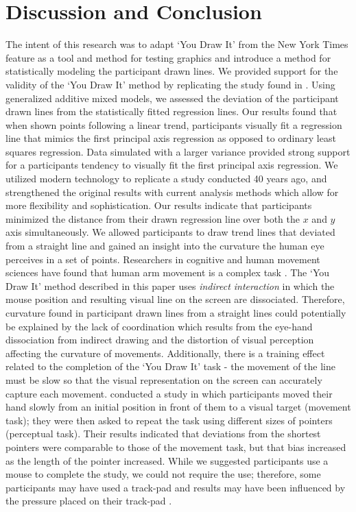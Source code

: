 \documentclass[12pt]{article}
\begin{document}
\hypertarget{conclusion-discussion}{%
\section{Discussion and Conclusion}\label{conclusion-discussion}}

The intent of this research was to adapt `You Draw It' from the New York
Times feature as a tool and method for testing graphics and introduce a
method for statistically modeling the participant drawn lines. We
provided support for the validity of the `You Draw It' method by
replicating the study found in \citet{mosteller1981eye}. Using
generalized additive mixed models, we assessed the deviation of the
participant drawn lines from the statistically fitted regression lines.
Our results found that when shown points following a linear trend,
participants visually fit a regression line that mimics the first
principal axis regression as opposed to ordinary least squares
regression. Data simulated with a larger variance provided strong
support for a participants tendency to visually fit the first principal
axis regression. We utilized modern technology to replicate a study
conducted 40 years ago, and strengthened the original results with
current analysis methods which allow for more flexibility and
sophistication. Our results indicate that participants minimized the
distance from their drawn regression line over both the \(x\) and \(y\)
axis simultaneously. We allowed participants to draw trend lines that
deviated from a straight line and gained an insight into the curvature
the human eye perceives in a set of points. Researchers in cognitive and
human movement sciences have found that human arm movement is a complex
task \citep{miall1995curvature, rousset2015study}. The `You Draw It'
method described in this paper uses \emph{indirect interaction} in which
the mouse position and resulting visual line on the screen are
dissociated. Therefore, curvature found in participant drawn lines from
a straight lines could potentially be explained by the lack of
coordination which results from the eye-hand dissociation from indirect
drawing and the distortion of visual perception affecting the curvature
of movements. Additionally, there is a training effect related to the
completion of the `You Draw It' task - the movement of the line must be
slow so that the visual representation on the screen can accurately
capture each movement. \citet{de1991misdirections} conducted a study in
which participants moved their hand slowly from an initial position in
front of them to a visual target (movement task); they were then asked
to repeat the task using different sizes of pointers (perceptual task).
Their results indicated that deviations from the shortest pointers were
comparable to those of the movement task, but that bias increased as the
length of the pointer increased. While we suggested participants use a
mouse to complete the study, we could not require the use; therefore,
some participants may have used a track-pad and results may have been
influenced by the pressure placed on their track-pad
\citep{easton1978finger}.
\end{document}
